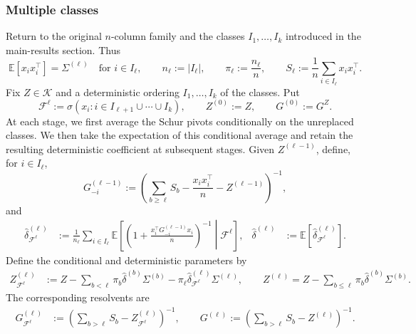 \documentclass[EJP, preprint, NODS, nobera, nofontexpansion]{ejpecp}
\begin{document}
\subsubsection{Multiple classes}

Return to the original \(n\)-column family and the classes
\(I_1,\ldots,I_k\) introduced in the main-results section.  Thus
\[
    \mathbb E[x_ix_i^\top]=\Sigma^{(\ell)}
    \quad\text{for }i\in I_{\ell},
    \qquad
    n_{\ell}:=|I_{\ell}|,
    \qquad
    \pi_{\ell}:=\frac{n_{\ell}}{n},
    \qquad
    S_{\ell}:=\frac1n\sum_{i\in I_{\ell}}x_ix_i^\top .
\]
Fix \(Z\in\mathcal K\) and a deterministic ordering
\(I_1,\ldots,I_k\) of the classes. Put
\[
    \mathcal F^{\ell}
    :=
    \sigma(x_i:i\in I_{\ell+1}\cup\cdots\cup I_k),
    \qquad
    Z^{(0)}:=Z,
    \qquad
    G^{(0)}:=G^Z.
\]
At each stage, we first average the Schur pivots conditionally on
the unreplaced classes. We then take the expectation of this
conditional average and retain the resulting deterministic
coefficient at subsequent stages.
Given \(Z^{(\ell-1)}\), define, for \(i\in I_{\ell}\),
\[
    G_{-i}^{(\ell-1)}
    :=
    \left(
        \sum_{b\geq \ell}S_b-\frac{x_ix_i^\top}{n}
        -Z^{(\ell-1)}
    \right)^{-1},
\]
and
\begin{align}
\label{eq:class_stage_pivots}
    \widehat\delta_{\mathcal F^{\ell}}^{(\ell)}
    &:=
    \frac1{n_{\ell}}\sum_{i\in I_{\ell}}
    \mathbb E\!\left[
        \left(
            1+\frac{x_i^\top G_{-i}^{(\ell-1)}x_i}{n}
        \right)^{-1}
        \middle|\mathcal F^{\ell}
    \right],
    &
    \widehat\delta^{(\ell)}
    &:=
    \mathbb E\!\left[
        \widehat\delta_{\mathcal F^{\ell}}^{(\ell)}
    \right].
\end{align}
Define the conditional and deterministic parameters by
\begin{align}
\label{eq:class_stage_parameters}
    Z_{\mathcal F^{\ell}}^{(\ell)}
    &:=
    Z-\sum_{b<\ell}\pi_b\widehat\delta^{(b)}\Sigma^{(b)}
    -\pi_{\ell}\widehat\delta_{\mathcal F^{\ell}}^{(\ell)}\Sigma^{(\ell)},
    \qquad
    Z^{(\ell)}
    =
    Z-\sum_{b\leq \ell}\pi_b\widehat\delta^{(b)}\Sigma^{(b)}.
\end{align}
The corresponding resolvents are
\begin{align}
\label{eq:class_stage_resolvents}
    G_{\mathcal F^{\ell}}^{(\ell)}
    &:=
    \left(
        \sum_{b>\ell}S_b-Z_{\mathcal F^{\ell}}^{(\ell)}
    \right)^{-1},
    \qquad
    G^{(\ell)}
    :=
    \left(
        \sum_{b>\ell}S_b-Z^{(\ell)}
    \right)^{-1}.
\end{align}
\end{document}
